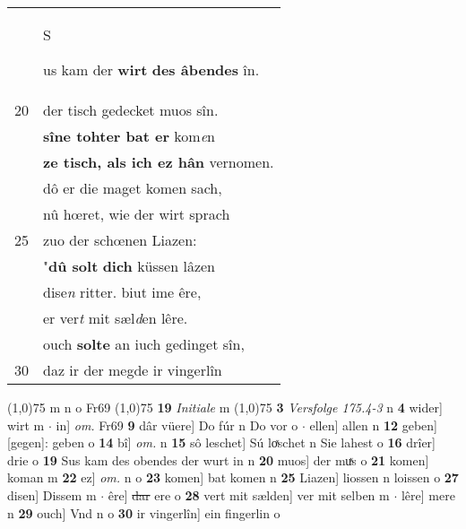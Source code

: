 \documentclass[8pt,a4paper,notitlepage]{article}
\begin{document}
\begin{table}[ht]
\begin{minipage}[t]{0.5\linewidth}
\begin{tabular}{rl}
 & \begin{large}S\end{large}us kam der \textbf{wirt} \textbf{des âbendes} în.\\ 
20 & der tisch gedecket muos sîn.\\ 
 & \textbf{sîne tohter bat er} kom\textit{e}n\\ 
 & \textbf{ze tisch, als ich ez hân} vernomen.\\ 
 & dô er die maget komen sach,\\ 
 & nû hœret, wie der wirt sprach\\ 
25 & zuo der schœnen Liazen:\\ 
 & "\textbf{dû solt} \textbf{dich} küssen lâzen\\ 
 & dise\textit{n} ritter. biut ime êre,\\ 
 & er ver\textit{t} mit sæl\textit{d}en lêre.\\ 
 & ouch \textbf{solte} an iuch gedinget sîn,\\ 
30 & daz ir der megde ir vingerlîn\\ 
\end{tabular}
\scriptsize
\line(1,0){75} \newline
m n o Fr69 \newline
\line(1,0){75} \newline
\textbf{19} \textit{Initiale} m  \newline
\line(1,0){75} \newline
\textbf{3} \textit{Versfolge 175.4-3} n  \textbf{4} wider] wirt m  $\cdot$ in] \textit{om.} Fr69 \textbf{9} dâr vüere] Do fúr n Do vor o  $\cdot$ ellen] allen n \textbf{12} geben] [gegen]: geben o \textbf{14} bî] \textit{om.} n \textbf{15} sô leschet] Sú loͯschet n Sie lahest o \textbf{16} drîer] drie o \textbf{19} Sus kam des obendes der wurt in n \textbf{20} muos] der muͯs o \textbf{21} komen] koman m \textbf{22} ez] \textit{om.} n o \textbf{23} komen] bat komen n \textbf{25} Liazen] liossen n loissen o \textbf{27} disen] Dissem m  $\cdot$ êre] \sout{dar} ere o \textbf{28} vert mit sælden] ver mit selben m  $\cdot$ lêre] mere n \textbf{29} ouch] Vnd n o \textbf{30} ir vingerlîn] ein fingerlin o \newline
\end{minipage}
\end{table}
\newpage
\end{document}
